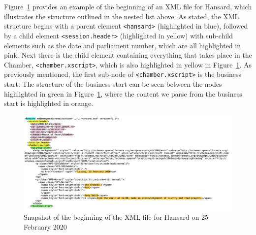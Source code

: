 \documentclass[
  letterpaper,
  DIV=11,
  numbers=noendperiod]{scrartcl}
\begin{document}
Figure~\ref{fig-xml1} provides an example of the beginning of an XML
file for Hansard, which illustrates the structure outlined in the nested
list above. As stated, the XML structure begins with a parent element
\texttt{\textless{}hansard\textgreater{}} (highlighted in blue),
followed by a child element
\texttt{\textless{}session.header\textgreater{}} (highlighted in yellow)
with sub-child elements such as the date and parliament number, which
are all highlighted in pink. Next there is the child element containing
everything that takes place in the Chamber,
\texttt{\textless{}chamber.xscript\textgreater{}}, which is also
highlighted in yellow in Figure~\ref{fig-xml1}. As previously mentioned,
the first sub-node of \texttt{\textless{}chamber.xscript\textgreater{}}
is the business start. The structure of the business start can be seen
between the nodes highlighted in green in Figure~\ref{fig-xml1}, where
the content we parse from the business start is highlighted in orange.

\begin{figure}

{\centering \includegraphics{images/xml1.png}

}

\caption{\label{fig-xml1}Snapshot of the beginning of the XML file for
Hansard on 25 February 2020}

\end{figure}
\end{document}
